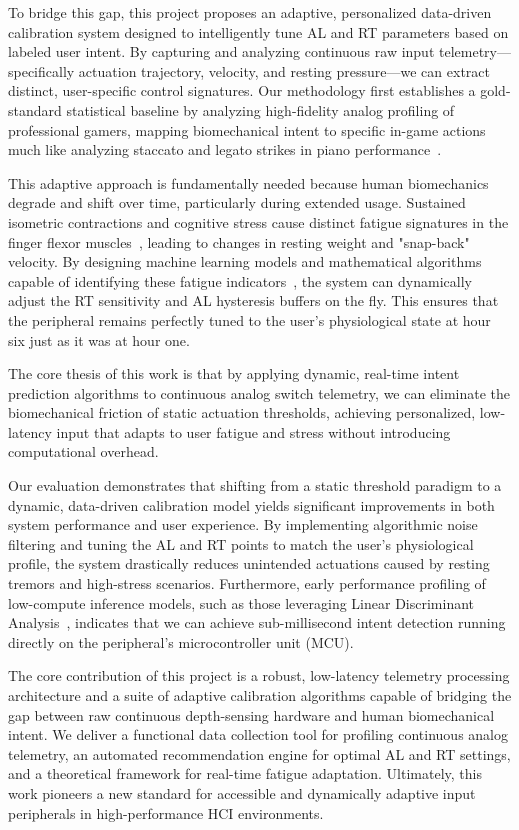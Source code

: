 \documentclass[a4paper,11pt,oneside]{report}
\begin{document}
To bridge this gap, this project proposes an adaptive, personalized data-driven calibration
system designed to intelligently tune AL and RT parameters based on labeled user intent. 
By capturing and analyzing continuous raw input telemetry---specifically actuation trajectory, 
velocity, and resting pressure---we can extract distinct, user-specific control signatures. 
Our methodology first establishes a gold-standard statistical baseline by analyzing 
high-fidelity analog profiling of professional gamers, mapping biomechanical intent to specific
in-game actions much like analyzing staccato and legato strikes in piano
performance~\cite{piano_3d_force}.

This adaptive approach is fundamentally needed because human biomechanics degrade and shift over
time, particularly during extended usage. Sustained isometric contractions and cognitive stress cause distinct fatigue signatures in the finger flexor muscles~\cite{fatigue_flexor}, leading to changes in resting weight and "snap-back" velocity. By designing machine learning models and mathematical algorithms capable of identifying these fatigue indicators~\cite{stress_pressure}, the system can dynamically adjust the RT sensitivity and AL hysteresis buffers on the fly. This ensures that the peripheral remains perfectly tuned to the user's physiological state at hour six just as it was at hour one.

The core thesis of this work is that by applying dynamic, real-time intent prediction algorithms
to continuous analog switch telemetry, we can eliminate the biomechanical friction of static actuation thresholds, achieving personalized, low-latency input that adapts to user fatigue and stress without introducing computational overhead.

Our evaluation demonstrates that shifting from a static threshold paradigm to a dynamic, data-driven calibration model yields significant improvements in both system performance and user experience. By implementing algorithmic noise filtering and tuning the AL and RT points to match the user's physiological profile, the system drastically reduces unintended actuations caused by resting tremors and high-stress scenarios. Furthermore, early performance profiling of low-compute inference models, such as those leveraging Linear Discriminant Analysis~\cite{lda_emg}, indicates that we can achieve sub-millisecond intent detection running directly on the peripheral's microcontroller unit (MCU).

The core contribution of this project is a robust, low-latency telemetry processing architecture
and a suite of adaptive calibration algorithms capable of bridging the gap between raw continuous depth-sensing hardware and human biomechanical intent. We deliver a functional data collection tool for profiling continuous analog telemetry, an automated recommendation engine for optimal AL and RT settings, and a theoretical framework for real-time fatigue adaptation. Ultimately, this work pioneers a new standard for accessible and dynamically adaptive input peripherals in high-performance HCI environments.
\end{document}
